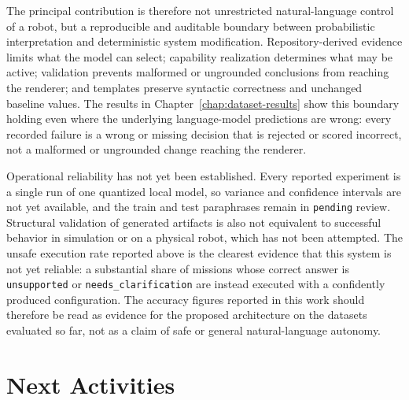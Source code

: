 The principal contribution is therefore not unrestricted natural-language control of a robot, but a reproducible and auditable boundary between probabilistic interpretation and deterministic system modification. Repository-derived evidence limits what the model can select; capability realization determines what may be active; validation prevents malformed or ungrounded conclusions from reaching the renderer; and templates preserve syntactic correctness and unchanged baseline values. The results in Chapter~\ref{chap:dataset-results} show this boundary holding even where the underlying language-model predictions are wrong: every recorded failure is a wrong or missing decision that is rejected or scored incorrect, not a malformed or ungrounded change reaching the renderer.

Operational reliability has not yet been established. Every reported experiment is a single run of one quantized local model, so variance and confidence intervals are not yet available, and the train and test paraphrases remain in \texttt{pending} review. Structural validation of generated artifacts is also not equivalent to successful behavior in simulation or on a physical robot, which has not been attempted. The unsafe execution rate reported above is the clearest evidence that this system is not yet reliable: a substantial share of missions whose correct answer is \texttt{unsupported} or \texttt{needs\_clarification} are instead executed with a confidently produced configuration. The accuracy figures reported in this work should therefore be read as evidence for the proposed architecture on the datasets evaluated so far, not as a claim of safe or general natural-language autonomy.

\section{Next Activities}
\label{sec:next-activities}

